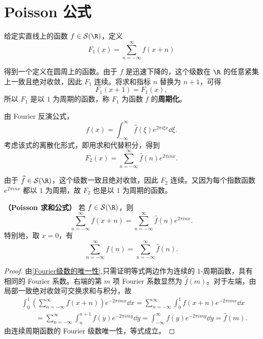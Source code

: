 \section{Poisson 公式}

\begin{definition}
	 给定实直线上的函数 $f\in\mathcal S(\R)$，定义
\[
F_1(x)=\sum_{n=-\infty}^{\infty}f(x+n)
\]
\end{definition}
得到一个定义在圆周上的函数。由于 $f$ 是迅速下降的，这个级数在 $\R$ 的任意紧集上一致且绝对收敛，因此 $F_1$ 连续。将求和指标 $n$ 替换为 $n+1$，可得
\[
F_1(x+1)=F_1(x),
\]
所以 $F_1$ 是以 $1$ 为周期的函数，称 $F_1$ 为函数 $f$ 的\textbf{周期化}。

\begin{definition}
	由 Fourier 反演公式，
\[
f(x)=\int_{-\infty}^{\infty}\widehat f(\xi)e^{2\pi i\xi x}\dd\xi.
\]
考虑该式的离散化形式，即用求和代替积分，得到
\[
F_2(x)=\sum_{n=-\infty}^{\infty}\widehat f(n)e^{2\pi i n x}.
\]
\end{definition}
由于 $\widehat f\in\mathcal S(\R)$，这个级数一致且绝对收敛，因此 $F_2$ 连续。又因为每个指数函数 $e^{2\pi i n x}$ 都以 $1$ 为周期，故 $F_2$ 也是以 $1$ 为周期的函数。

\begin{theorem}
	\textbf{（Poisson 求和公式）}
	若 $f\in\mathcal S(\R)$，则
	\[
	\sum_{n=-\infty}^{\infty}f(x+n)
	=
	\sum_{n=-\infty}^{\infty}\widehat f(n)e^{2\pi i n x}.
	\]
	特别地，取 $x=0$，有
	\[
	\sum_{n=-\infty}^{\infty}f(n)
	=
	\sum_{n=-\infty}^{\infty}\widehat f(n).
	\]
	\label{thm:poisson-summation}
\end{theorem}
\newpage
\begin{proof}
	由\ref{Fourier级数的唯一性},只需证明等式两边作为连续的 $1$-周期函数，具有相同的 Fourier 系数。右端的第 $m$ 项 Fourier 系数显然为 $\widehat f(m)$。对于左端，由局部一致绝对收敛可交换求和与积分，故
	\[
	\begin{aligned}
		&\int_0^1\left(\sum_{n=-\infty}^{\infty}f(x+n)\right)e^{-2\pi i m x}\dd x=\sum_{n=-\infty}^{\infty}\int_0^1f(x+n)e^{-2\pi i m x}\dd x\\
		&\qquad=\sum_{n=-\infty}^{\infty}\int_n^{n+1}f(y)e^{-2\pi i m y}\dd y=\int_{-\infty}^{\infty}f(y)e^{-2\pi i m y}\dd y
		=\widehat f(m).
	\end{aligned}
	\]
	由连续周期函数的 Fourier 级数唯一性，等式成立。
\end{proof}

